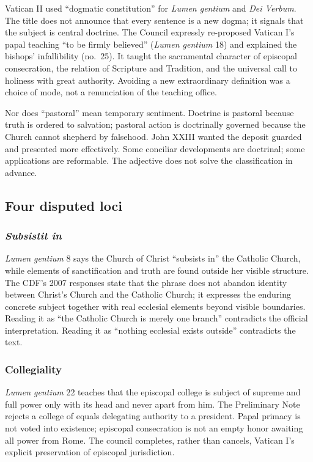 Vatican II used “dogmatic constitution” for \emph{Lumen gentium} and \emph{Dei Verbum}. The title does not announce that every sentence is a new dogma; it signals that the subject is central doctrine. The Council expressly re-proposed Vatican I's papal teaching “to be firmly believed” (\emph{Lumen gentium} 18) and explained the bishops' infallibility (no.~25). It taught the sacramental character of episcopal consecration, the relation of Scripture and Tradition, and the universal call to holiness with great authority. Avoiding a new extraordinary definition was a choice of mode, not a renunciation of the teaching office.

Nor does “pastoral” mean temporary sentiment. Doctrine is pastoral because truth is ordered to salvation; pastoral action is doctrinally governed because the Church cannot shepherd by falsehood. John XXIII wanted the deposit guarded and presented more effectively. Some conciliar developments are doctrinal; some applications are reformable. The adjective does not solve the classification in advance.

\subsection{Four disputed loci}

\subsubsection{\emph{Subsistit in}}

\emph{Lumen gentium} 8 says the Church of Christ “subsists in” the Catholic Church, while elements of sanctification and truth are found outside her visible structure. The CDF's 2007 responses state that the phrase does not abandon identity between Christ's Church and the Catholic Church; it expresses the enduring concrete subject together with real ecclesial elements beyond visible boundaries. Reading it as “the Catholic Church is merely one branch” contradicts the official interpretation. Reading it as “nothing ecclesial exists outside” contradicts the text.

\subsubsection{Collegiality}

\emph{Lumen gentium} 22 teaches that the episcopal college is subject of supreme and full power only with its head and never apart from him. The Preliminary Note rejects a college of equals delegating authority to a president. Papal primacy is not voted into existence; episcopal consecration is not an empty honor awaiting all power from Rome. The council completes, rather than cancels, Vatican I's explicit preservation of episcopal jurisdiction.

